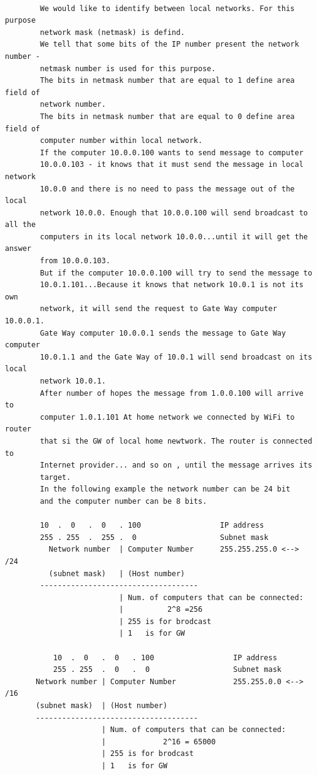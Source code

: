 \documentclass[a4paper,12pt]{article}
\begin{document}
\begin{verbatim}
              
        We would like to identify between local networks. For this purpose  
        network mask (netmask) is defind.
        We tell that some bits of the IP number present the network number - 
        netmask number is used for this purpose.
        The bits in netmask number that are equal to 1 define area field of  
        network number.
        The bits in netmask number that are equal to 0 define area  field of 
        computer number within local network. 
        If the computer 10.0.0.100 wants to send message to computer 
        10.0.0.103 - it knows that it must send the message in local network 
        10.0.0 and there is no need to pass the message out of the local 
        network 10.0.0. Enough that 10.0.0.100 will send broadcast to all the 
        computers in its local network 10.0.0...until it will get the answer 
        from 10.0.0.103. 
        But if the computer 10.0.0.100 will try to send the message to       
        10.0.1.101...Because it knows that network 10.0.1 is not its own       
        network, it will send the request to Gate Way computer 10.0.0.1.
        Gate Way computer 10.0.0.1 sends the message to Gate Way computer  
        10.0.1.1 and the Gate Way of 10.0.1 will send broadcast on its local 
        network 10.0.1.
        After number of hopes the message from 1.0.0.100 will arrive to 
        computer 1.0.1.101 At home network we connected by WiFi to router 
        that si the GW of local home newtwork. The router is connected to 
        Internet provider... and so on , until the message arrives its 
        target.
        In the following example the network number can be 24 bit
        and the computer number can be 8 bits.
        
        10  .  0   .  0   . 100                  IP address
        255 . 255  .  255 .  0                   Subnet mask
          Network number  | Computer Number      255.255.255.0 <--> /24
          (subnet mask)   | (Host number)
        ------------------------------------        
                          | Num. of computers that can be connected: 
                          |          2^8 =256
                          | 255 is for brodcast
                          | 1   is for GW

           10  .  0   .  0   . 100                  IP address
           255 . 255  .  0   .  0                   Subnet mask 
       Network number | Computer Number             255.255.0.0 <--> /16
       (subnet mask)  | (Host number)       
       -------------------------------------        
                      | Num. of computers that can be connected:
                      |             2^16 = 65000
                      | 255 is for brodcast
                      | 1   is for GW


\end{verbatim}
\end{document}
